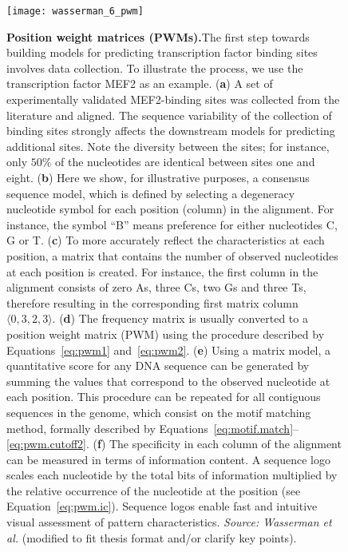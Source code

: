 \begin{figure}[h!]
\centering
\texttt{[image: wasserman\_6\_pwm]}
\caption[Position weight matrices (PWMs)]{\textbf{Position weight matrices (PWMs).}The first step towards building models for predicting transcription factor binding sites involves data collection. To illustrate the process, we use the transcription factor MEF2 as an example. (\textbf{a}) A set of experimentally validated MEF2-binding sites was collected from the literature and aligned. The sequence variability of the collection of binding sites strongly affects the downstream models for predicting additional sites. Note the diversity between the sites; for instance, only $50\%$ of the nucleotides are identical between sites one and eight. (\textbf{b}) Here we show, for illustrative purposes, a consensus sequence model, which is defined by selecting a degeneracy nucleotide symbol for each position (column) in the alignment. For instance, the symbol ``B'' means preference for either nucleotides C, G or T. (\textbf{c}) To more accurately reflect the characteristics at each position, a matrix that contains the number of observed nucleotides at each position is created. For instance, the first column in the alignment consists of zero As, three Cs, two Gs and three Ts, therefore resulting in the corresponding first matrix column $\langle 0, 3, 2, 3 \rangle$. (\textbf{d}) The frequency matrix is usually converted to a position weight matrix (PWM) using the procedure described by Equations~\ref{eq:pwm1} and~\ref{eq:pwm2}. (\textbf{e}) Using a matrix model, a quantitative score for any DNA sequence can be generated by summing the values that correspond to the observed nucleotide at each position. This procedure can be repeated for all contiguous sequences in the genome, which consist on the motif matching method, formally described by Equations~\ref{eq:motif.match}--\ref{eq:pwm.cutoff2}. (\textbf{f}) The specificity in each column of the alignment can be measured in terms of information content. A sequence logo scales each nucleotide by the total bits of information multiplied by the relative occurrence of the nucleotide at the position (see Equation~\ref{eq:pwm.ic}). Sequence logos enable fast and intuitive visual assessment of pattern characteristics. \emph{Source: Wasserman et al.}\cite{wasserman2004} (modified to fit thesis format and/or clarify key points).}
\label{fig:wasserman_pwm}
\end{figure}

